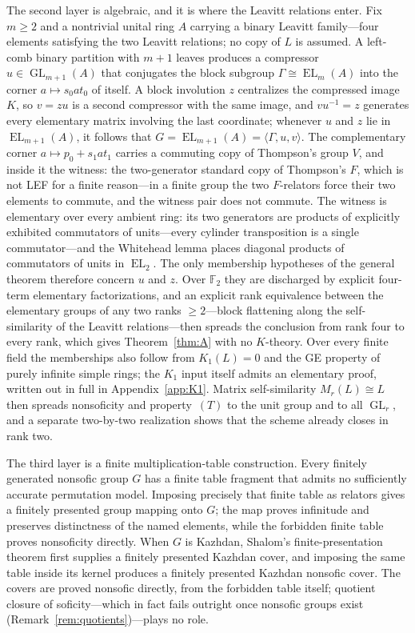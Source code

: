 \documentclass[11pt]{amsart}
\theoremstyle{definition}
\theoremstyle{plain}
\newcommand{\F}{\mathbb F}
\newcommand{\GL}{\operatorname{GL}}
\newcommand{\EL}{\operatorname{EL}}
\begin{document}
The second layer is algebraic, and it is where the Leavitt relations enter.  Fix \(m\geq2\) and a nontrivial unital ring \(A\) carrying a binary Leavitt family---four elements satisfying the two Leavitt relations; no copy of \(L\) is assumed.  A left-comb binary partition with \(m+1\) leaves produces a compressor \(u\in\GL_{m+1}(A)\) that conjugates the block subgroup \(\Gamma\cong\EL_m(A)\) into the corner \(a\mapsto s_0at_0\) of itself.  A block involution \(z\) centralizes the compressed image \(K\), so \(v=zu\) is a second compressor with the same image, and \(vu^{-1}=z\) generates every elementary matrix involving the last coordinate; whenever \(u\) and \(z\) lie in \(\EL_{m+1}(A)\), it follows that \(G=\EL_{m+1}(A)=\langle\Gamma,u,v\rangle\).  The complementary corner \(a\mapsto p_0+s_1at_1\) carries a commuting copy of Thompson's group \(V\), and inside it the witness: the two-generator standard copy of Thompson's \(F\), which is not LEF for a finite reason---in a finite group the two \(F\)-relators force their two elements to commute, and the witness pair does not commute.  The witness is elementary over every ambient ring: its two generators are products of explicitly exhibited commutators of units---every cylinder transposition is a single commutator---and the Whitehead lemma places diagonal products of commutators of units in \(\EL_2\).  The only membership hypotheses of the general theorem therefore concern \(u\) and \(z\).  Over \(\F_2\) they are discharged by explicit four-term elementary factorizations, and an explicit rank equivalence between the elementary groups of any two ranks \(\geq2\)---block flattening along the self-similarity of the Leavitt relations---then spreads the conclusion from rank four to every rank, which gives Theorem~\ref{thm:A} with no \(K\)-theory.  Over every finite field the memberships also follow from \(K_1(L)=0\) and the GE property of purely infinite simple rings; the \(K_1\) input itself admits an elementary proof, written out in full in Appendix~\ref{app:K1}.  Matrix self-similarity \(M_r(L)\cong L\) then spreads nonsoficity and property~\((T)\) to the unit group and to all \(\GL_r\), and a separate two-by-two realization shows that the scheme already closes in rank two.

The third layer is a finite multiplication-table construction.  Every finitely generated nonsofic group \(G\) has a finite table fragment that admits no sufficiently accurate permutation model.  Imposing precisely that finite table as relators gives a finitely presented group mapping onto \(G\); the map proves infinitude and preserves distinctness of the named elements, while the forbidden finite table proves nonsoficity directly.  When \(G\) is Kazhdan, Shalom's finite-presentation theorem first supplies a finitely presented Kazhdan cover, and imposing the same table inside its kernel produces a finitely presented Kazhdan nonsofic cover.  The covers are proved nonsofic directly, from the forbidden table itself; quotient closure of soficity---which in fact fails outright once nonsofic groups exist (Remark~\ref{rem:quotients})---plays no role.
\end{document}
